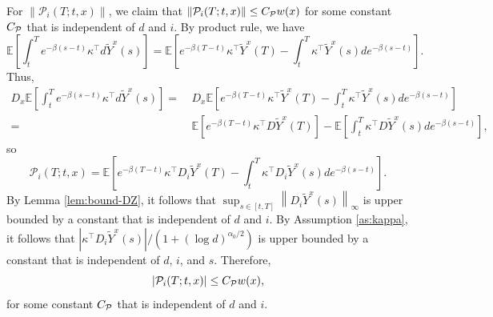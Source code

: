 \documentclass[11pt]{article}
\theoremstyle{definition}
\theoremstyle{plain}
\newcommand{\E}{\mathbb{E}}
\newcommand{\cP}{{\cal P}}
\begin{document}
\begin{appendices}
  For $\| \mathcal{P}_i(T; t,x) \|$, we claim that \( \| \mathcal{P}_i(T; t,x) \| \leq C_\cP w(x) \) for some  
  constant \( C_\cP\) that is independent of $d$ and $i$. 
  By product rule, we have 
  \[
  \E\left[\int_t^T e^{-\beta(s-t)} \kappa^{\top} d\tilde Y^x (s)\right] = \E\left[e^{-\beta(T-t)} \kappa^{\top} \tilde Y^x (T) - \int_t^T \kappa^{\top} \tilde Y^x(s) de^{-\beta(s-t)}\right].
  \]
  Thus, 
  \begin{align*}
  D_x \E\left[\int_t^T e^{-\beta(s-t)} \kappa^{\top} d\tilde Y^x (s)\right] 
  =&~D_x \E\left[e^{-\beta(T-t)} \kappa^{\top} \tilde Y^x (T) - \int_t^T \kappa^{\top} \tilde Y^x(s) de^{-\beta(s-t)}\right] \\
  =&~\E\left[e^{-\beta(T-t)} \kappa^{\top} D\tilde Y^x (T)\right] - \E\left[\int_t^T \kappa^{\top} D\tilde Y^x(s) de^{-\beta(s-t)}\right],
  \end{align*}
  so
  \[
  \mathcal{P}_i(T; t,x) = \E\left[e^{-\beta(T-t)} \kappa^{\top} D_i\tilde Y^x (T) - \int_t^T \kappa^{\top} D_i\tilde Y^x(s) de^{-\beta(s-t)}\right].
  \]
  By Lemma \ref{lem:bound-DZ}, it follows that $\sup_{s\in[t,T]} \left\|D_i\tilde Y^x(s)\right\|_\infty$ is upper bounded by a constant that is independent of $d$ 
  and $i$. By Assumption \ref{as:kappa}, it follows that $\left|\kappa^\top D_i\tilde Y^x (s)\right|/\left(1+(\log d)^{\alpha_0/2}\right)$ is upper bounded by a constant that is independent of $d$, $i$, 
  and $s$. Therefore, 
  \[
  \left|\mathcal{P}_i(T; t,x)\right| \leq C_\cP w(x),
  \]
  for some constant $C_\cP$ that is independent of $d$ and $i$.
  

\end{appendices}
\end{document}
